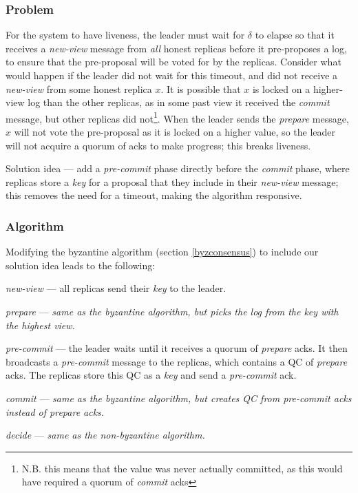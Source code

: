\subsubsection{Problem}
For the system to have liveness, the leader must wait for $\delta$ to elapse so that it receives a \textit{new-view} message from \textit{all} honest replicas before it pre-proposes a log, to ensure that the pre-proposal will be voted for by the replicas. Consider what would happen if the leader did not wait for this timeout, and did not receive a \textit{new-view} from some honest replica $x$. It is possible that $x$ is locked on a higher-view log than the other replicas, as in some past view it received the \textit{commit} message, but other replicas did not\footnote{N.B. this means that the value was never actually committed, as this would have required a quorum of \textit{commit} acks}. When the leader sends the \textit{prepare} message, $x$ will not vote the pre-proposal as it is locked on a higher value, so the leader will not acquire a quorum of acks to make progress; this breaks liveness.

Solution idea --- add a \textit{pre-commit} phase directly before the \textit{commit} phase, where replicas store a \textit{key} for a proposal that they include in their \textit{new-view} message; this removes the need for a timeout, making the algorithm responsive.

\subsubsection{Algorithm}

Modifying the byzantine algorithm (section \ref{byzconsensus}) to include our solution idea leads to the following:

\begin{description}
	\item \textit{new-view} --- all replicas send their \textit{key} to the leader.
	\item \textit{prepare} ---  \textit{same as the byzantine algorithm, but picks the log from the key with the highest view.}
	\item \textit{pre-commit} --- the leader waits until it receives a quorum of \textit{prepare} acks. It then broadcasts a \textit{pre-commit} message to the replicas, which contains a QC of \textit{prepare} acks. The replicas store this QC as a \textit{key} and send a \textit{pre-commit} ack.
	\item \textit{commit} --- \textit{same as the byzantine algorithm, but creates QC from pre-commit acks instead of prepare acks.}
	\item \textit{decide} --- \textit{same as the non-byzantine algorithm.}
\end{description}

